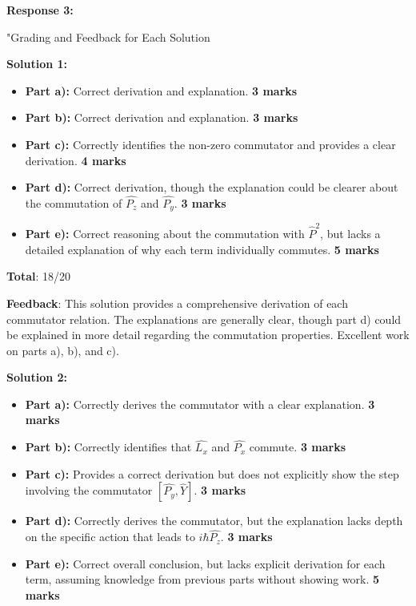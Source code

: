 \documentclass[a4paper,11pt]{article}
\begin{document}
\textbf{Response 3:}

"Grading and Feedback for Each Solution

\textbf{Solution 1:}

\begin{itemize}
    \item \textbf{Part a):} Correct derivation and explanation. \textbf{3 marks}
    \item \textbf{Part b):} Correct derivation and explanation. \textbf{3 marks}
    \item \textbf{Part c):} Correctly identifies the non-zero commutator and provides a clear derivation. \textbf{4 marks}
    \item \textbf{Part d):} Correct derivation, though the explanation could be clearer about the commutation of \( \hat{P_{z}} \) and \( \hat{P_{y}} \). \textbf{3 marks}
    \item \textbf{Part e):} Correct reasoning about the commutation with \( \hat{P}^{2} \), but lacks a detailed explanation of why each term individually commutes. \textbf{5 marks}
\end{itemize}

\textbf{Total}: 18/20

\textbf{Feedback}: This solution provides a comprehensive derivation of each commutator relation. The explanations are generally clear, though part d) could be explained in more detail regarding the commutation properties. Excellent work on parts a), b), and c).

\textbf{Solution 2:}

\begin{itemize}
    \item \textbf{Part a):} Correctly derives the commutator with a clear explanation. \textbf{3 marks}
    \item \textbf{Part b):} Correctly identifies that \( \hat{L_{x}} \) and \( \hat{P_{x}} \) commute. \textbf{3 marks}
    \item \textbf{Part c):} Provides a correct derivation but does not explicitly show the step involving the commutator \( [ \hat{P_{y}}, \hat{Y} ] \). \textbf{3 marks}
    \item \textbf{Part d):} Correctly derives the commutator, but the explanation lacks depth on the specific action that leads to \( i\hbar\hat{P_{z}} \). \textbf{3 marks}
    \item \textbf{Part e):} Correct overall conclusion, but lacks explicit derivation for each term, assuming knowledge from previous parts without showing work. \textbf{5 marks}
\end{itemize}
\end{document}
